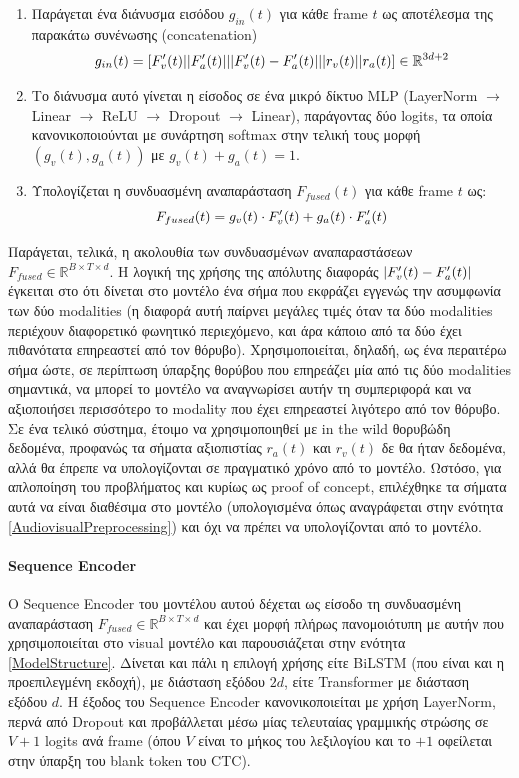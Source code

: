 \begin{enumerate}
\item Παράγεται ένα διάνυσμα εισόδου $g_{in}(t)$ για κάθε frame $t$ ως αποτέλεσμα της παρακάτω συνένωσης (concatenation)
\[
g_{in}(t) = [ F_v\sp{\prime}(t) || F_a\sp{\prime}(t) || \lvert F_v\sp{\prime}(t) - F_a\sp{\prime}(t) \rvert || r_v(t) || r_a(t) ] \in \mathbb{R}^{3d+2}
\]

\item Το διάνυσμα αυτό γίνεται η είσοδος σε ένα μικρό δίκτυο MLP (LayerNorm $\rightarrow$ Linear $\rightarrow$ ReLU $\rightarrow$ Dropout $\rightarrow$ Linear), παράγοντας δύο logits, τα οποία κανονικοποιούνται με συνάρτηση softmax στην τελική τους μορφή $(g_v(t),g_a(t))$ με $g_v(t) + g_a(t) = 1$.

\item Υπολογίζεται η συνδυασμένη αναπαράσταση $F_{fused}(t)$ για κάθε frame $t$ ως:
\[
F_{fused}(t) = g_v(t) \cdot F_v\sp{\prime}(t) + g_a(t) \cdot F_a\sp{\prime}(t)
\]
\end{enumerate}

Παράγεται, τελικά, η ακολουθία των συνδυασμένων αναπαραστάσεων $F_{fused} \in \mathbb{R}^{B \times T \times d}$. Η λογική της χρήσης της απόλυτης διαφοράς $\lvert F_v\sp{\prime}(t) - F_a\sp{\prime}(t) \rvert$ έγκειται στο ότι δίνεται στο μοντέλο ένα σήμα που εκφράζει εγγενώς την ασυμφωνία των δύο modalities (η διαφορά αυτή παίρνει μεγάλες τιμές όταν τα δύο modalities περιέχουν διαφορετικό φωνητικό περιεχόμενο, και άρα κάποιο από τα δύο έχει πιθανότατα επηρεαστεί από τον θόρυβο). Χρησιμοποιείται, δηλαδή, ως ένα περαιτέρω σήμα ώστε, σε περίπτωση ύπαρξης θορύβου που επηρεάζει μία από τις δύο modalities σημαντικά, να μπορεί το μοντέλο να αναγνωρίσει αυτήν τη συμπεριφορά και να αξιοποιήσει περισσότερο το modality που έχει επηρεαστεί λιγότερο από τον θόρυβο. Σε ένα τελικό σύστημα, έτοιμο να χρησιμοποιηθεί με in the wild θορυβώδη δεδομένα, προφανώς τα σήματα αξιοπιστίας $r_a(t)$ και $r_v(t)$ δε θα ήταν δεδομένα, αλλά θα έπρεπε να υπολογίζονται σε πραγματικό χρόνο από το μοντέλο. Ωστόσο, για απλοποίηση του προβλήματος και κυρίως ως proof of concept, επιλέχθηκε τα σήματα αυτά να είναι διαθέσιμα στο μοντέλο (υπολογισμένα όπως αναγράφεται στην ενότητα \ref{AudiovisualPreprocessing}) και όχι να πρέπει να υπολογίζονται από το μοντέλο.

\paragraph{Sequence Encoder}
Ο Sequence Encoder του μοντέλου αυτού δέχεται ως είσοδο τη συνδυασμένη αναπαράσταση $F_{fused} \in \mathbb{R}^{B \times T \times d}$ και έχει μορφή πλήρως πανομοιότυπη με αυτήν που χρησιμοποιείται στο visual μοντέλο και παρουσιάζεται στην ενότητα \ref{ModelStructure}. Δίνεται και πάλι η επιλογή χρήσης είτε BiLSTM (που είναι και η προεπιλεγμένη εκδοχή), με διάσταση εξόδου $2d$, είτε Transformer με διάσταση εξόδου $d$. Η έξοδος του Sequence Encoder κανονικοποιείται με χρήση LayerNorm, περνά από Dropout και προβάλλεται μέσω μίας τελευταίας γραμμικής στρώσης σε $V+1$ logits ανά frame (όπου $V$ είναι το μήκος του λεξιλογίου και το $+1$ οφείλεται στην ύπαρξη του blank token του CTC).

